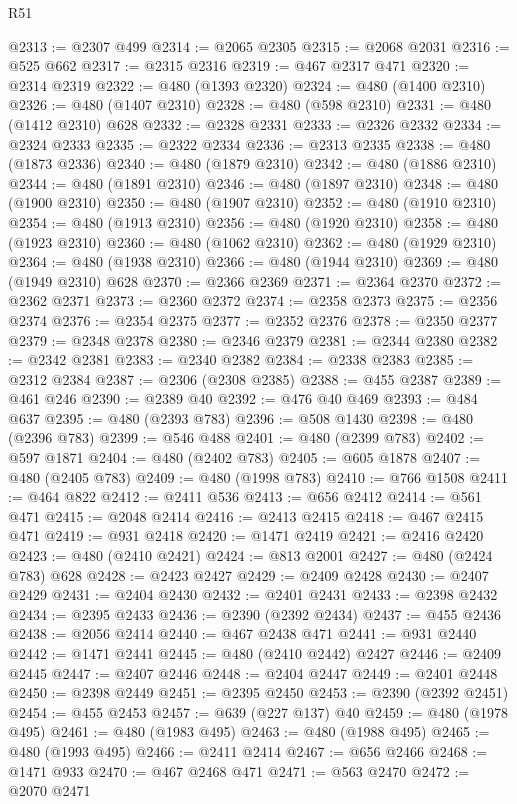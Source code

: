 \begin{lexlean}{R51}
\begin{coremodule}
@2313 := @2307 @499
@2314 := @2065 @2305
@2315 := @2068 @2031
@2316 := @525 @662
@2317 := @2315 @2316
@2319 := @467 @2317 @471
@2320 := @2314 @2319
@2322 := @480 (@1393 @2320)
@2324 := @480 (@1400 @2310)
@2326 := @480 (@1407 @2310)
@2328 := @480 (@598 @2310)
@2331 := @480 (@1412 @2310) @628
@2332 := @2328 @2331
@2333 := @2326 @2332
@2334 := @2324 @2333
@2335 := @2322 @2334
@2336 := @2313 @2335
@2338 := @480 (@1873 @2336)
@2340 := @480 (@1879 @2310)
@2342 := @480 (@1886 @2310)
@2344 := @480 (@1891 @2310)
@2346 := @480 (@1897 @2310)
@2348 := @480 (@1900 @2310)
@2350 := @480 (@1907 @2310)
@2352 := @480 (@1910 @2310)
@2354 := @480 (@1913 @2310)
@2356 := @480 (@1920 @2310)
@2358 := @480 (@1923 @2310)
@2360 := @480 (@1062 @2310)
@2362 := @480 (@1929 @2310)
@2364 := @480 (@1938 @2310)
@2366 := @480 (@1944 @2310)
@2369 := @480 (@1949 @2310) @628
@2370 := @2366 @2369
@2371 := @2364 @2370
@2372 := @2362 @2371
@2373 := @2360 @2372
@2374 := @2358 @2373
@2375 := @2356 @2374
@2376 := @2354 @2375
@2377 := @2352 @2376
@2378 := @2350 @2377
@2379 := @2348 @2378
@2380 := @2346 @2379
@2381 := @2344 @2380
@2382 := @2342 @2381
@2383 := @2340 @2382
@2384 := @2338 @2383
@2385 := @2312 @2384
@2387 := @2306 (@2308 @2385)
@2388 := @455 @2387
@2389 := @461 @246
@2390 := @2389 @40
@2392 := @476 @40 @469
@2393 := @484 @637
@2395 := @480 (@2393 @783)
@2396 := @508 @1430
@2398 := @480 (@2396 @783)
@2399 := @546 @488
@2401 := @480 (@2399 @783)
@2402 := @597 @1871
@2404 := @480 (@2402 @783)
@2405 := @605 @1878
@2407 := @480 (@2405 @783)
@2409 := @480 (@1998 @783)
@2410 := @766 @1508
@2411 := @464 @822
@2412 := @2411 @536
@2413 := @656 @2412
@2414 := @561 @471
@2415 := @2048 @2414
@2416 := @2413 @2415
@2418 := @467 @2415 @471
@2419 := @931 @2418
@2420 := @1471 @2419
@2421 := @2416 @2420
@2423 := @480 (@2410 @2421)
@2424 := @813 @2001
@2427 := @480 (@2424 @783) @628
@2428 := @2423 @2427
@2429 := @2409 @2428
@2430 := @2407 @2429
@2431 := @2404 @2430
@2432 := @2401 @2431
@2433 := @2398 @2432
@2434 := @2395 @2433
@2436 := @2390 (@2392 @2434)
@2437 := @455 @2436
@2438 := @2056 @2414
@2440 := @467 @2438 @471
@2441 := @931 @2440
@2442 := @1471 @2441
@2445 := @480 (@2410 @2442) @2427
@2446 := @2409 @2445
@2447 := @2407 @2446
@2448 := @2404 @2447
@2449 := @2401 @2448
@2450 := @2398 @2449
@2451 := @2395 @2450
@2453 := @2390 (@2392 @2451)
@2454 := @455 @2453
@2457 := @639 (@227 @137) @40
@2459 := @480 (@1978 @495)
@2461 := @480 (@1983 @495)
@2463 := @480 (@1988 @495)
@2465 := @480 (@1993 @495)
@2466 := @2411 @2414
@2467 := @656 @2466
@2468 := @1471 @933
@2470 := @467 @2468 @471
@2471 := @563 @2470
@2472 := @2070 @2471

\end{coremodule}
\end{lexlean}
